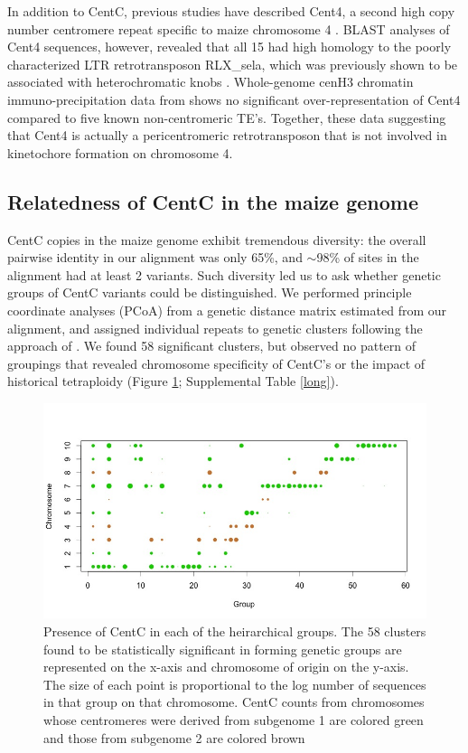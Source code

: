 In addition to CentC, previous studies have described Cent4, a second high copy number centromere repeat specific to maize chromosome 4 \citep{Page2001}.   BLAST analyses of Cent4 sequences, however, revealed that all 15 had high homology to the poorly characterized LTR retrotransposon RLX\_sela, which was previously shown to be associated with heterochromatic  knobs \citep{Tenaillon2011, Chia2012}.  Whole-genome cenH3 chromatin immuno-precipitation data from  \citet{Wolfgruber2009} shows no significant over-representation of Cent4 compared to five known non-centromeric TE’s. Together, these data suggesting that Cent4 is actually a pericentromeric retrotransposon that is not involved in kinetochore formation on chromosome 4.
	
\subsection*{Relatedness of CentC in the maize genome}

CentC copies in the maize genome exhibit tremendous diversity: the overall pairwise identity in our alignment was only 65\%, and $\sim$98\% of sites in the alignment had at least 2 variants.  Such diversity led us to ask whether genetic groups of CentC variants could be distinguished. We performed principle coordinate analyses (PCoA) from a genetic distance matrix estimated from our alignment, and assigned individual repeats to  genetic clusters following the approach of \citet{Patterson2006}.  We found 58 significant clusters, but observed no pattern of groupings that revealed chromosome specificity of CentC’s or the impact of historical tetraploidy (Figure \ref{pcoa}; Supplemental Table \ref{long}).

\begin{figure}[h]
\centering
\includegraphics[width=1\textwidth]{Fig2_TWgroups}
\caption{Presence of CentC in each of the heirarchical groups.  The 58 clusters found to be statistically significant in forming genetic groups are represented on the x-axis and chromosome of origin on the y-axis. The size of each point is proportional to the log number of sequences in that group on that chromosome. CentC counts from chromosomes whose centromeres were derived from subgenome 1 are colored green and those from subgenome 2 are colored brown 
}
\label{pcoa}    
\end{figure}


